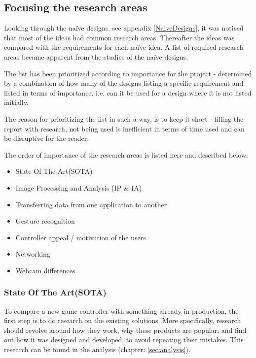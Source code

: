 \subsection{Focusing the research areas}
Looking through the naïve designs. see appendix \ref{NaiveDesigns}, it was noticed that most of the ideas had common research areas. Thereafter the ideas was compared with the requirements for each naïve idea. A list of required research areas became apparent from the studies of the naïve designs.

The list has been prioritized according to importance for the project - determined by a combination of how many of the designs listing a specific requirement and listed in terms of importance. i.e. can it be used for a design where it is not listed initially.

The reason for prioritizing the list in such a way, is to keep it short - filling the report with research, not being used is inefficient in terms of time used and can be disruptive for the reader.
\bigskip

The order of importance of the research areas is listed here and described below:
\begin{itemize}
\item State Of The Art(SOTA)
\item Image Processing and Analysis (IP \& IA)
\item Transferring data from one application to another
\item Gesture recognition
\item Controller appeal / motivation of the users
\item Networking
\item Webcam differences
\end{itemize}

\subsubsection{State Of The Art(SOTA)}
To compare a new game controller with something already in production, the first step is to do research on the existing solutions. More specifically, research should revolve around how they work, why these products are popular, and find out how it was designed and developed, to avoid repeating their mistakes. This research can be found in the analysis (chapter: \ref{sec:analysis}).


